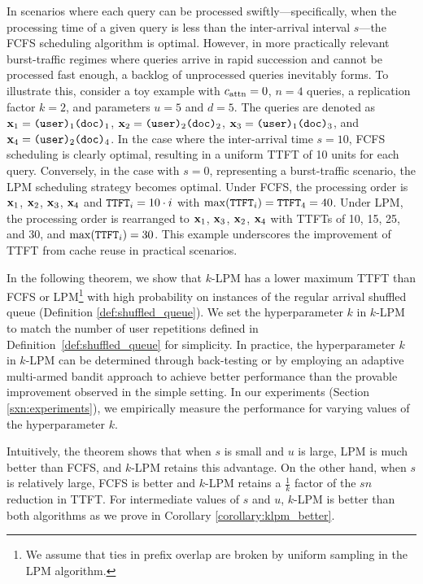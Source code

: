 In scenarios where each query can be processed swiftly—specifically, when the processing time of a given query is less than the inter-arrival interval $s$—the FCFS scheduling algorithm is optimal. However, in more practically relevant burst-traffic regimes where queries arrive in rapid succession and cannot be processed fast enough, a backlog of unprocessed queries inevitably forms. To illustrate this, consider a toy example with $c_{\mathrm{attn}}=0$, $n = 4$ queries, a replication factor $k = 2$, and parameters $u = 5$ and $d = 5$. The queries are denoted as $\mathbf{x}_1 = \texttt{(user)}_1\texttt{(doc)}_1$, $\mathbf{x}_2 = \texttt{(user)}_2\texttt{(doc)}_2$, $\mathbf{x}_3 = \texttt{(user)}_1\texttt{(doc)}_3$, and $\mathbf{x}_4 = \texttt{(user)}_2\texttt{(doc)}_4$. In the case where the inter-arrival time $s = 10$, FCFS scheduling is clearly optimal, resulting in a uniform TTFT of 10 units for each query. Conversely, in the case with $s = 0$, representing a burst-traffic scenario, the LPM scheduling strategy becomes optimal. Under FCFS, the processing order is $\mathbf{x}_1$, $\mathbf{x}_2$, $\mathbf{x}_3$, $\mathbf{x}_4$ and $\texttt{TTFT}_i = 10 \cdot i$ with $\max(\texttt{TTFT}_i) = \texttt{TTFT}_4 = 40$. Under LPM, the processing order is rearranged to $\mathbf{x}_1$, $\mathbf{x}_3$, $\mathbf{x}_2$, $\mathbf{x}_4$ with TTFTs of 10, 15, 25, and 30, and $\max(\texttt{TTFT}_i) = 30$. This example underscores the improvement of TTFT from cache reuse in practical scenarios.

In the following theorem, we show that $k$-LPM has a lower maximum TTFT than FCFS or LPM\footnote{We assume that ties in prefix overlap are broken by uniform sampling in the LPM algorithm.} with high probability on instances of the regular arrival shuffled queue (Definition \ref{def:shuffled_queue}). We set the hyperparameter $k$ in $k$-LPM to match the number of user repetitions defined in Definition~\ref{def:shuffled_queue} for simplicity. In practice, the hyperparameter $k$ in $k$-LPM can be determined through back-testing or by employing an adaptive multi-armed bandit approach to achieve better performance than the provable improvement observed in the simple setting. In our experiments (Section \ref{sxn:experiments}), we empirically measure the performance for varying values of the hyperparameter $k$.


Intuitively, the theorem shows that when $s$ is small and $u$ is large, LPM is much better than FCFS, and $k$-LPM retains this advantage. On the other hand, when $s$ is relatively large, FCFS is better and $k$-LPM retains a $\frac{1}{k}$ factor of the $sn$ reduction in TTFT. For intermediate values of $s$ and $u$, $k$-LPM is better than both algorithms as we prove in Corollary \ref{corollary:klpm_better}. 

